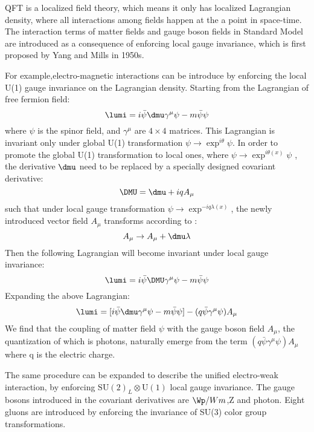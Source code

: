  QFT is a localized field theory, which means it only has localized Lagrangian density, where all interactions among fields happen at the a point in space-time. The interaction terms of matter fields and gauge boson fields in Standard Model are introduced as a consequence of enforcing local gauge invariance, which is first proposed by Yang and Mills in 1950s. 
 
 For example,electro-magnetic interactions can be introduce by enforcing the local U(1) gauge invariance on the Lagrangian density. Starting from the Lagrangian of free fermion field:
 \begin{equation}
 \lumi = i\bar\psi \dmu \gamma^\mu \psi-m\bar\psi\psi
 \end{equation}
 where $\psi$ is the spinor field, and $\gamma^\mu$ are $4\times4$ matrices. This Lagrangian is invariant only under global U(1) transformation $\psi\rightarrow \exp^{i\theta}\psi$. In order to promote the global U(1) transformation to local ones, where $\psi\rightarrow \exp^{i\theta(x)}\psi$ , the derivative $\dmu$ need to be replaced by a specially designed covariant derivative:
 \begin{equation}
 \DMU = \dmu+iqA_\mu
 \end{equation}
 such that under local gauge transformation $\psi\rightarrow\exp^{-iq\lambda(x)}$, the newly introduced vector field $A_\mu$ transforms according to :
 \begin{equation}
 A_\mu\rightarrow A_{\mu}+\dmu\lambda
 \end{equation}
 Then the following Lagrangian will become invariant under local gauge invariance:
  \begin{equation}
 \lumi = i\bar\psi \DMU\gamma^\mu \psi-m\bar\psi\psi
 \end{equation}
 Expanding the above Lagrangian: 
  \begin{equation}
 \lumi = [i\bar\psi \dmu \gamma^\mu \psi-m\bar\psi\psi] - (q\bar\psi\gamma^\mu\psi)A_\mu
 \end{equation}
 We find that the coupling of matter field $\psi$ with the gauge boson field $A_\mu$, the quantization of which is photons, naturally emerge from the term $(q\bar\psi\gamma^\mu\psi)A_\mu$ where q is the electric charge.
 
 The same procedure can be expanded to describe the unified electro-weak interaction, by enforcing $\mathrm{SU}(2)_L\otimes\mathrm{U}(1)$ local gauge invariance. The gauge bosons introduced in the covariant derivatives are $\Wp/Wm$,Z and photon. Eight gluons are introduced by enforcing the invariance of SU(3) color group transformations.  
 
